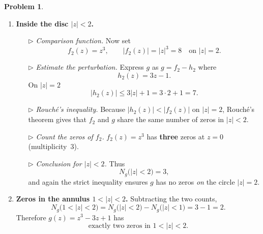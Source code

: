 \documentclass[12pt]{article}
\theoremstyle{definition} %
\newtheorem{problem}{Problem}
\theoremstyle{plain} %
\begin{document}
\begin{problem}
\begin{enumerate}
        \item \textbf{Inside the disc $|z|<2$.}

              \begin{enumerate}
                  \item[$\triangleright$] \emph{Comparison function.}  
                        Now set
                        $$f_{2}(z)=z^{3},\qquad |f_{2}(z)|=|z|^{3}=8
                                                     \quad\text{on }|z|=2.$$

                  \item[$\triangleright$] \emph{Estimate the perturbation.}  
                        Express $g$ as $g=f_{2}-h_{2}$ where
                        $$h_{2}(z)=3z-1.$$
                        On $|z|=2$
                        $$|h_{2}(z)|\le 3|z|+1 = 3\cdot2+1 = 7.$$

                  \item[$\triangleright$] \emph{Rouché’s inequality.}  
                        Because $|h_{2}(z)|<|f_{2}(z)|$ on $|z|=2$,  
                        Rouché’s theorem gives that $f_{2}$ and $g$ share the
                        same number of zeros in $|z|<2$.

                  \item[$\triangleright$] \emph{Count the zeros of $f_{2}$.}  
                        $f_{2}(z)=z^{3}$ has \textbf{three} zeros at $z=0$
                        (multiplicity 3).

                  \item[$\triangleright$] \emph{Conclusion for $|z|<2$.}  
                        Thus
                        $$N_{g}\bigl(|z|<2\bigr)=3,$$
                        and again the strict inequality ensures $g$ has no
                        zeros \emph{on} the circle $|z|=2$.
              \end{enumerate}

        \item \textbf{Zeros in the annulus $1<|z|<2$.}  
              Subtracting the two counts,
              \[
                  N_{g}\bigl(1<|z|<2\bigr)
                  = N_{g}\bigl(|z|<2\bigr) - N_{g}\bigl(|z|<1\bigr)
                  = 3-1 = 2.
              \]
              Therefore $g(z)=z^{3}-3z+1$ has
              \[
                  \boxed{\text{exactly two zeros in }1<|z|<2.}
              \]
    \end{enumerate}
\end{problem}
\end{document}

